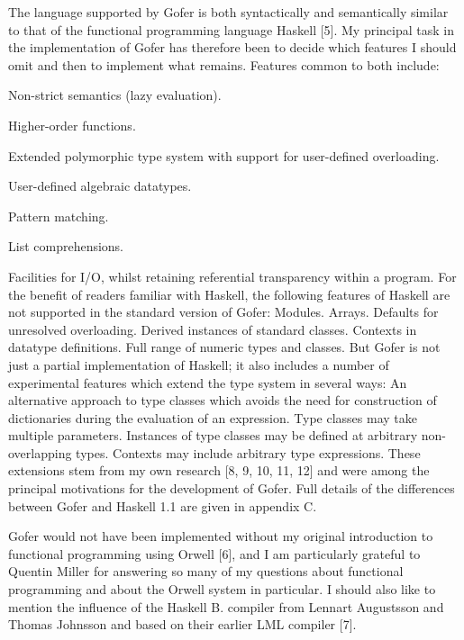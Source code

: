 The language supported by Gofer is both syntactically and  semantically
similar to that of the functional programming language Haskell [5].  My
principal task in the implementation of Gofer  has  therefore  been  to
decide which  features  I  should  omit  and  then  to  implement  what
remains.  Features common to both include:
\BSI
\item Non-strict semantics (lazy evaluation).
\item Higher-order functions.
\item Extended polymorphic type system  with  support  for  user-defined
     overloading.
\item User-defined algebraic datatypes.
\item Pattern matching.
\item List comprehensions.
\item Facilities for  I/O,  whilst  retaining  referential  transparency
     within a program.
\ESI
For the  benefit  of  readers  familiar  with  Haskell,  the  following
features of Haskell are not supported in the standard version of Gofer:
\BSI
\IT Modules.
\IT Arrays.
\IT Defaults for unresolved overloading.
\IT Derived instances of standard classes.
\IT Contexts in datatype definitions.
\IT Full range of numeric types and classes.
\ESI
But Gofer is not just a partial  implementation  of  Haskell;  it  also
includes a number of experimental features which extend the type system
in several ways:
\BSI
\IT An alternative approach to type classes which avoids the need  for
     construction  of  dictionaries  during  the   evaluation   of   an
     expression.
\IT Type classes may take multiple parameters.
\IT Instances  of  type  classes   may   be   defined   at   arbitrary
     non-overlapping types.
\IT Contexts may include arbitrary type expressions.
\ESI
These extensions stem from my own research [8, 9, 10, 11, 12] and  were
among the principal motivations for the  development  of  Gofer.   Full
details of the differences between Gofer and Haskell 1.1 are  given  in
appendix C.

Gofer would not have been implemented without my original  introduction
to functional programming using  Orwell  [6],  and  I  am  particularly
grateful to Quentin Miller for answering so many of my questions  about
functional programming and about the Orwell system  in  particular.   I
should also like to mention the influence of the  Haskell  B.  compiler
from Lennart Augustsson and Thomas Johnsson and based on their  earlier
LML compiler [7].

